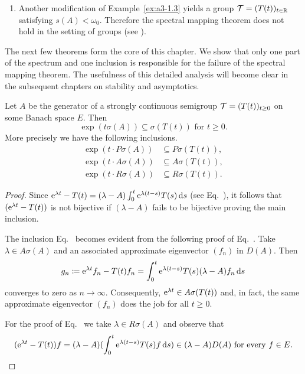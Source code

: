 \begin{example}
\begin{enumerate}[\upshape (i), wide, labelindent=.25em]
\item 
Another modification of Example~\ref{ex:a3-1.3} yields a group $\mathcal{T} = (T(t))_{t \in \mathbb{R}}$ satisfying $s(A) < \omega_{0}$.
Therefore the spectral mapping theorem does not hold in the setting of groups (see \textcite{wolff:1981}).
\end{enumerate}
\end{example}
The next few theorems form the core of this chapter. 
We show that only one part of the spectrum and one inclusion is responsible for the failure of the spectral mapping theorem.
The usefulness of this detailed analysis will become clear in the subsequent chapters on stability and asymptotics.
\begin{proposition}
\label{prop:a3-6.2}%
Let $A$ be the generator of a strongly continuous semigroup $\TT = (T(t))_{t \geq 0}$ on some Banach space $E$.
Then
\[
\exp(t\sigma(A)) \subseteq \sigma(T(t)) \text{ for } t \geq 0 .
\]
More precisely we have the following inclusions.
\begin{align}
\exp(t \cdot P\sigma(A)) &\subseteq P\sigma(T(t)) \label{eq:a3-6.1} , \\
\exp(t \cdot A\sigma(A)) &\subseteq A\sigma(T(t)) \label{eq:a3-6.2} , \\
\exp(t \cdot R\sigma(A)) &\subseteq R\sigma(T(t)) \label{eq:a3-6.3} .
\end{align}
\end{proposition}
\begin{proof}
Since $\mathrm{e}^{\lambda t} - T(t) = (\lambda - A)\int_{0}^{t} \mathrm{e}^{\lambda(t-s)}T(s) \mathop{}\!\mathrm{d}{s}$ (see Eq.~), it follows that $(\mathrm{e}^{\lambda t} - T(t))$ is not bijective if\/ $(\lambda - A)$ fails to be bijective proving the main inclusion.

The inclusion Eq.~ becomes evident from the following proof of Eq.~. Take $\lambda \in A\sigma(A)$ and an associated approximate eigenvector $(f_{n})$ in $D(A)$.
Then
\[%
g_{n} \coloneq \eu^{\lambda t}f_{n} - T(t)f_{n} = \int_{0}^{t} \eu^{\lambda(t-s)}T(s)(\lambda-A)f_{n} \ds
\]
converges to zero as $n \to \infty$.
Consequently, $\mathrm{e}^{\lambda t} \in A\sigma(T(t))$ and, in fact, the same approximate eigenvector $(f_{n})$ does the job for all $t \geq 0$.

For the proof of Eq.~ we take $\lambda \in R\sigma(A)$ and observe that 
\begin{equation*}
(\mathrm{e}^{\lambda t} - T(t))f = (\lambda - A)(\int_{0}^{t} \mathrm{e}^{\lambda(t-s)}T(s)f \mathop{}\!\mathrm{d}{s}) \in (\lambda - A)D(A) \text{ for every } f \in E.
\qedhere
\end{equation*}
\end{proof}
